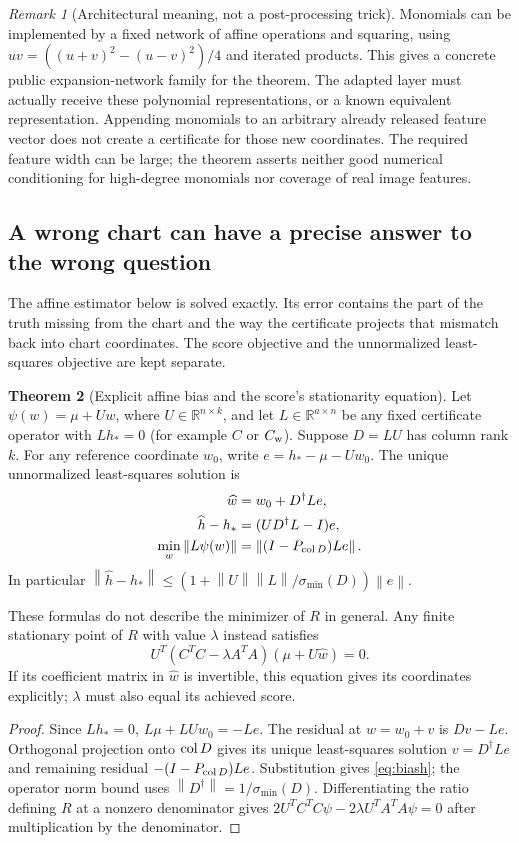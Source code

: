 \documentclass[11pt,a4paper]{article}
\theoremstyle{definition}
\newtheorem{theorem}{Theorem}[section]
\theoremstyle{definition}
\theoremstyle{remark}\newtheorem{remark}[theorem]{Remark}
\newcommand{\R}{\mathbb R}\newcommand{\Prob}{\mathbb P}\newcommand{\E}{\mathbb E}
\newcommand{\smin}{\sigma_{\min}}\newcommand{\smax}{\sigma_{\max}}
\newcommand{\norm}[1]{\left\lVert #1\right\rVert}
\newcommand{\proj}[1]{P_{#1}}
\begin{document}
\begin{remark}[Architectural meaning, not a post-processing trick]
Monomials can be implemented by a fixed network of affine operations and squaring, using $uv=((u+v)^2-(u-v)^2)/4$ and iterated products. This gives a concrete public expansion-network family for the theorem. The adapted layer must actually receive these polynomial representations, or a known equivalent representation. Appending monomials to an arbitrary already released feature vector does not create a certificate for those new coordinates. The required feature width can be large; the theorem asserts neither good numerical conditioning for high-degree monomials nor coverage of real image features.
\end{remark}

\subsection{A wrong chart can have a precise answer to the wrong question}

The affine estimator below is solved exactly. Its error contains the part of the truth missing from the chart and the way the certificate projects that mismatch back into chart coordinates. The score objective and the unnormalized least-squares objective are kept separate.

\begin{theorem}[Explicit affine bias and the score's stationarity equation]\label{thm:bias}
Let $\psi(w)=\mu+Uw$, where $U\in\R^{n\times k}$, and let $L\in\R^{a\times n}$ be any fixed certificate operator with $Lh_*=0$ (for example $C$ or $C_{\rm w}$). Suppose $D=LU$ has column rank $k$. For any reference coordinate $w_0$, write $e=h_*-\mu-Uw_0$. The unique unnormalized least-squares solution is
\begin{align}
\widehat w&=w_0+D^\dagger Le,\label{eq:biasw}\\
\widehat h-h_*&=(UD^\dagger L-I)e,\label{eq:biash}\\
\min_w\norm{L\psi(w)}&=\norm{(I-\proj{\col D})Le}.\label{eq:resid}
\end{align}
In particular $\norm{\widehat h-h_*}\le(1+\norm U\norm L/\smin(D))\norm e$.

These formulas do not describe the minimizer of $R$ in general. Any finite stationary point of $R$ with value $\lambda$ instead satisfies
\[
U^T(C^TC-\lambda A^TA)(\mu+U\widehat w)=0.
\]
If its coefficient matrix in $\widehat w$ is invertible, this equation gives its coordinates explicitly; $\lambda$ must also equal its achieved score.
\end{theorem}
\begin{proof}
Since $Lh_*=0$, $L\mu+LUw_0=-Le$. The residual at $w=w_0+v$ is $Dv-Le$. Orthogonal projection onto $\operatorname{col} D$ gives its unique least-squares solution $v=D^\dagger Le$ and remaining residual $-(I-\proj{\col D})Le$. Substitution gives \eqref{eq:biash}; the operator norm bound uses $\norm{D^\dagger}=1/\smin(D)$. Differentiating the ratio defining $R$ at a nonzero denominator gives $2U^TC^TC\psi-2\lambda U^TA^TA\psi=0$ after multiplication by the denominator.
\end{proof}
\end{document}
